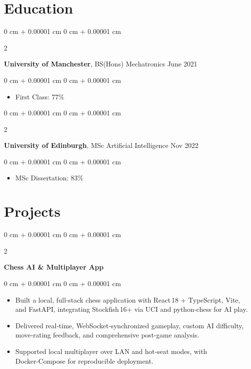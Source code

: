\documentclass[10pt, letterpaper]{article}
\newenvironment{highlights}{
    \begin{itemize}[
        topsep=0.10 cm,
        parsep=0.10 cm,
        partopsep=0pt,
        itemsep=0pt,
        leftmargin=0 cm + 10pt
    ]
}{
    \end{itemize}
} %
\newenvironment{onecolentry}{
    \begin{adjustwidth}{
        0 cm + 0.00001 cm
    }{
        0 cm + 0.00001 cm
    }
}{
    \end{adjustwidth}
} %
\newenvironment{twocolentry}[2][]{
    \onecolentry
    \def\secondColumn{#2}
    \setcolumnwidth{\fill, 4.5 cm}
    \begin{paracol}{2}
}{
    \switchcolumn \raggedleft \secondColumn
    \end{paracol}
    \endonecolentry
} %
\begin{document}
\section{Education}
\begin{twocolentry}{
            June 2021
        }
            \textbf{University of Manchester}, BS(Hons) Mechatronics\end{twocolentry}

        \vspace{0.10 cm}
        \begin{onecolentry}
            \begin{highlights}
                \item First Class: 77\%
            \end{highlights}
        \end{onecolentry}
        
        \vspace{0.10 cm}
        
        \begin{twocolentry}{
            Nov 2022
        }
            \textbf{University of Edinburgh}, MSc Artificial Intelligence\end{twocolentry}

        \vspace{0.10 cm}
        \begin{onecolentry}
            \begin{highlights}
                \item MSc Dissertation: 83\%
            \end{highlights}
        \end{onecolentry}
\section{Projects}
\begin{twocolentry}{
        
        }
            \textbf{Chess AI & Multiplayer App}\end{twocolentry}
        \vspace{0.10 cm}
        \begin{onecolentry}
            \begin{highlights}
                \item Built a local, full‑stack chess application with React 18 + TypeScript, Vite, and FastAPI, integrating Stockfish 16+ via UCI and python‑chess for AI play.
                \item Delivered real‑time, WebSocket‑synchronized gameplay, custom AI difficulty, move‑rating feedback, and comprehensive post‑game analysis.
                \item Supported local multiplayer over LAN and hot‑seat modes, with Docker‑Compose for reproducible deployment.
            \end{highlights}
        \end{onecolentry}
\end{document}
